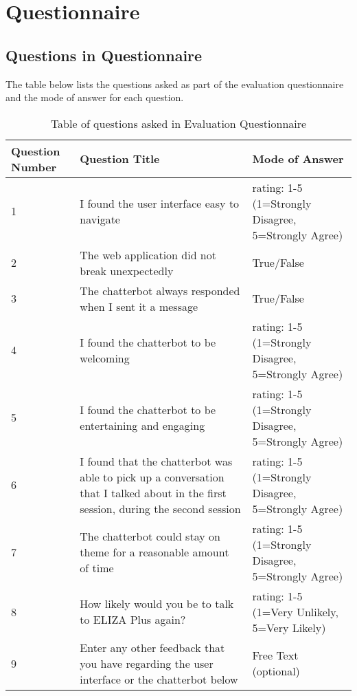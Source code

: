 \chapter{Questionnaire} \label{app:questionnaire}
\section{Questions in Questionnaire}
The table below lists the questions asked as part of the evaluation questionnaire and the mode of answer for each question.\\
\begin{table}[H]
	\centering
	\begin{tabular}{ |m{1.8cm}|m{7cm}|m{6cm}| } 
		\hline
		\textbf{Question Number} & \textbf{Question Title} & \textbf{Mode of Answer} \\ 
		\hline
		1 & I found the user interface easy to navigate & rating: 1-5 (1=Strongly Disagree, 5=Strongly Agree) \\ 
		\hline
		2 & 
		The web application did not break unexpectedly & True/False \\ 
		\hline
		3 & The chatterbot always responded when I sent it a message & True/False \\
		\hline 
		4 & I found the chatterbot to be welcoming & rating: 1-5 (1=Strongly Disagree, 5=Strongly Agree) \\
		\hline
		5 & I found the chatterbot to be entertaining and engaging & rating: 1-5 (1=Strongly Disagree, 5=Strongly Agree) \\
		\hline
		6 & I found that the chatterbot was able to pick up a conversation that I talked about in the first session, during the second session & rating: 1-5 (1=Strongly Disagree, 5=Strongly Agree) \\
		\hline
		7 & The chatterbot could stay on theme for a reasonable amount of time & rating: 1-5 (1=Strongly Disagree, 5=Strongly Agree) \\
		\hline
		8 & 
		How likely would you be to talk to ELIZA Plus again? & rating: 1-5 (1=Very Unlikely, 5=Very Likely) \\
		\hline
		9 & 
		Enter any other feedback that you have regarding the user interface or the chatterbot below & Free Text (optional) \\
		\hline
	\end{tabular}
	\caption{Table of questions asked in Evaluation Questionnaire}
\end{table}
\pagebreak
